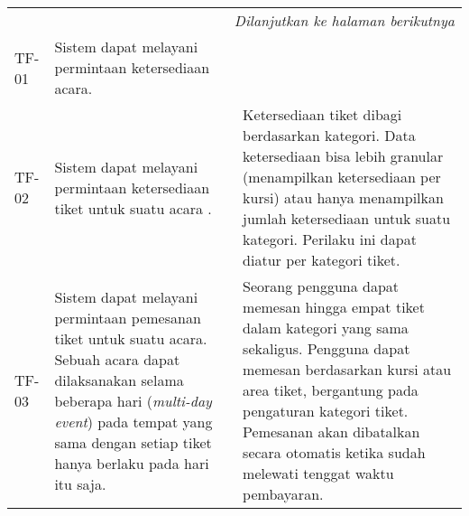 \begin{longtable}{|l|p{}|p{}|}
    \hline
    \multicolumn{3}{|r|}{\textit{Dilanjutkan ke halaman berikutnya}}                                                                                                                                                                                                                                                                                                                                                                                                                                                                                                                                      \\
    \endfoot

    \hline
    \endlastfoot

    \hline
    TF-01       & Sistem dapat melayani permintaan ketersediaan acara.                                                                                                                                                                            &                                                                                                                                                                                                                                                                                                                                                       \\
    \hline
    \hline
    TF-02       & Sistem dapat melayani permintaan ketersediaan tiket untuk suatu acara .                                                                                                                                                         & Ketersediaan tiket dibagi berdasarkan kategori. Data ketersediaan bisa lebih granular (menampilkan ketersediaan per kursi) atau hanya menampilkan jumlah ketersediaan untuk suatu kategori. Perilaku ini dapat diatur per kategori tiket.                                                                                                             \\
    \hline
    \hline
    TF-03       & Sistem dapat melayani permintaan pemesanan tiket untuk suatu acara. Sebuah acara dapat dilaksanakan selama beberapa hari (\textit{multi-day event}) pada tempat yang sama dengan setiap tiket hanya berlaku pada hari itu saja. & Seorang pengguna dapat memesan hingga empat tiket dalam kategori yang sama sekaligus. Pengguna dapat memesan berdasarkan kursi atau area tiket, bergantung pada pengaturan kategori tiket. Pemesanan akan dibatalkan secara otomatis ketika sudah melewati tenggat waktu pembayaran.                                                                  \\

\end{longtable}
